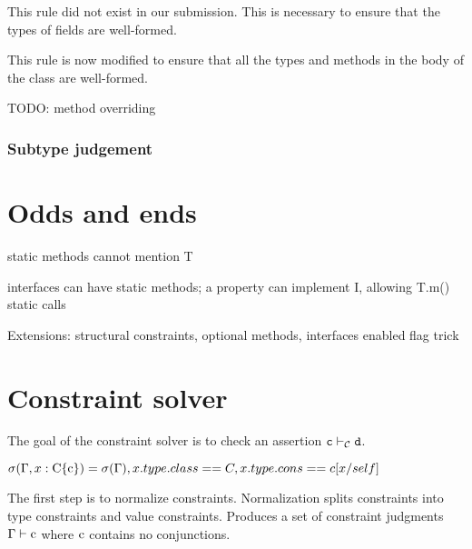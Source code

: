 \documentclass[preprint,nocopyrightspace,9pt]{sigplanconf}
\begin{document}
This rule did not exist in our submission. This is necessary to ensure
that the types of fields are well-formed.



This rule is now modified to ensure that all the types and methods in
the body of the class are well-formed.


TODO: method overriding


\subsubsection{
        Subtype judgement
}



\section{Odds and ends}

static methods cannot mention T

interfaces can have static methods; a property can implement I,
allowing T.m() static calls

Extensions: structural constraints, optional methods, interfaces
        enabled flag trick


\section{Constraint solver}

The goal of the constraint solver is 
to check an assertion ${\tt c} \vdash_{\cal C} {\tt d}$.

$\sigma(\Gamma, x: \Xcd{C\{c\}}) = 
        \sigma(\Gamma), x.type.class==C, x.type.cons==c[x/self]
$

The first step is to normalize constraints.
Normalization splits constraints into type constraints and
value constraints.  Produces a set of constraint judgments
$\Gamma \vdash \Xcd{c}$ where $\Xcd{c}$ contains no conjunctions.
\end{document}

